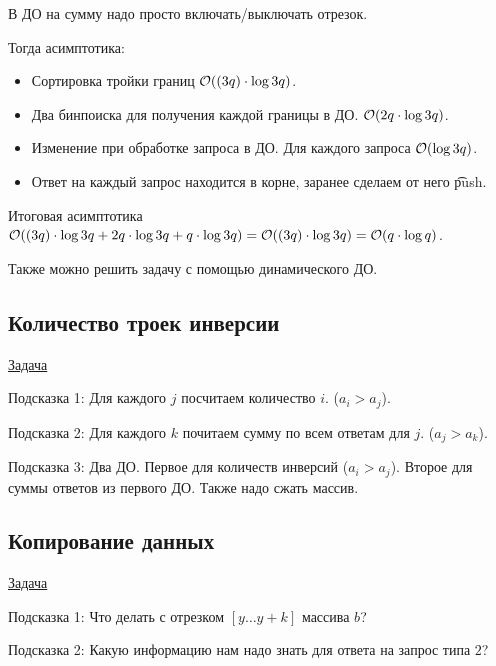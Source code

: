 В ДО на сумму надо просто включать/выключать отрезок.

Тогда асимптотика:

\up \up
\begin{itemize}
	\item Сортировка тройки границ $\mathcal{O}((3q) \cdot \log 3q)$.
	
	\item Два бинпоиска для получения каждой границы в ДО. $\mathcal{O}(2q \cdot \log 3q)$.
	
	\item Изменение при обработке запроса в ДО. Для каждого запроса $\mathcal{O}(\log 3q)$.
	
	\item Ответ на каждый запрос находится в корне, заранее сделаем от него \t{push}.
\end{itemize}

Итоговая асимптотика $\mathcal{O}((3q) \cdot \log 3q + 2q \cdot \log 3q + q \cdot \log 3q) = \mathcal{O}((3q) \cdot \log 3q) = \mathcal{O}(q \cdot \log q)$.

Также можно решить задачу с помощью динамического ДО.

\subsection{Количество троек инверсии}

\href{https://codeforces.com/contest/61/problem/E}{Задача} \href{https://codeforces.com/contest/61/submission/124484488}{}

Подсказка 1: Для каждого $j$ посчитаем количество $i$. ($a_i > a_j$).

Подсказка 2: Для каждого $k$ почитаем сумму по всем ответам для $j$. ($a_j > a_k$).

Подсказка 3: Два ДО. Первое для количеств инверсий ($a_i > a_j$). Второе для суммы ответов из первого ДО. Также надо сжать массив.

\subsection{Копирование данных}

\href{https://codeforces.com/contest/292/problem/E}{Задача}
\href{https://codeforces.com/contest/292/submission/124450504}{}

Подсказка 1: Что делать с отрезком $[y \dots y + k]$ массива $b$?

Подсказка 2: Какую информацию нам надо знать для ответа на запрос типа $2$?


